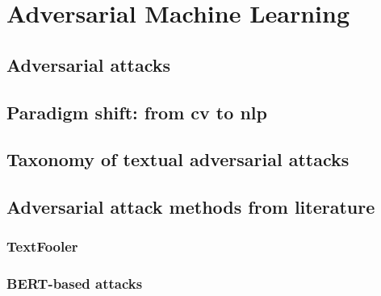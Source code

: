 \section{Adversarial Machine Learning}\label{sec:adversarial-machine-learning}

\subsection{Adversarial attacks}\label{subsec:adversarial-attacks}

\subsection[Paradigm shift]{Paradigm shift: from \gls{cv} to \gls{nlp}}\label{subsec:paradigm-shift}

\subsection{Taxonomy of textual adversarial attacks}\label{subsec:taxonomy-textual-adversarial-attacks}

\subsection{Adversarial attack methods from literature}\label{subsec:aam-from-literature}

\subsubsection{TextFooler}\label{subsubsec:textfooler}

\subsubsection{BERT-based attacks}\label{subsubsec:bert-based-attacks}